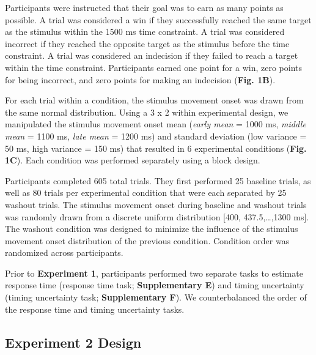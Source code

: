 \documentclass[man,donotrepeattitle,floatsintext,letterpaper,12pt]{apa7}
\newcommand\boldblue[1]{\textcolor{mydarkblue}{\textbf{#1}}}
\begin{document}
Participants were instructed that their goal was to earn as many points as possible. A trial was considered a win if they successfully reached the same target as the stimulus within the 1500 ms time constraint. A trial was considered incorrect if they reached the opposite target as the stimulus before the time constraint. A trial was considered an indecision if they failed to reach a target within the time constraint. Participants earned one point for a win, zero points for being incorrect, and zero points for making an indecision (\boldblue{Fig. 1B}).

For each trial within a condition, the stimulus movement onset was drawn from the same normal distribution. Using a 3 x 2 within experimental design, we manipulated the stimulus movement onset mean (\emph{early mean} = 1000 ms, \emph{middle mean} = 1100 ms, \emph{late mean} = 1200 ms) and standard deviation (low variance = 50 ms, high variance = 150 ms) that resulted in 6 experimental conditions (\boldblue{Fig. 1C}).  Each condition was performed separately using a block design.

Participants completed 605 total trials. They first performed 25 baseline trials, as well as 80 trials per experimental condition that were each separated by 25 washout trials. The stimulus movement onset during baseline and washout trials was randomly drawn from a discrete uniform distribution [400, 437.5,…,1300 ms]. The washout condition was designed to minimize the influence of the stimulus movement onset distribution of the previous condition. Condition order was randomized across participants.

Prior to \boldblue{Experiment 1}, participants performed two separate tasks to estimate response time (response time task; \boldblue{Supplementary E}) and timing uncertainty (timing uncertainty task; \boldblue{Supplementary F}). We counterbalanced the order of the response time and timing uncertainty tasks.

\subsection{Experiment 2 Design}
\end{document}
